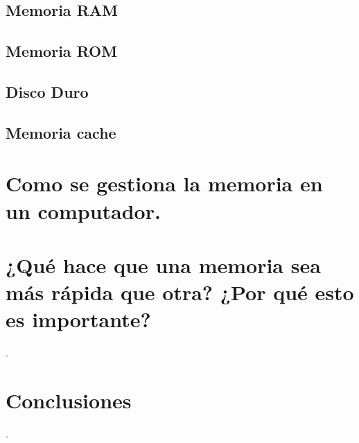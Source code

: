 \documentclass{article}
\begin{document}
\subsection{Memoria RAM}
\subsection{Memoria ROM}
\subsection{Disco Duro}
\subsection{Memoria cache}


\section{Como se gestiona la memoria en un computador.} \label{contenido}

\section{¿Qué hace que una memoria sea más rápida que otra? ¿Por qué esto es importante?}.\label{contenido}

\section{Conclusiones}.\label{contenido}




\end{document}

